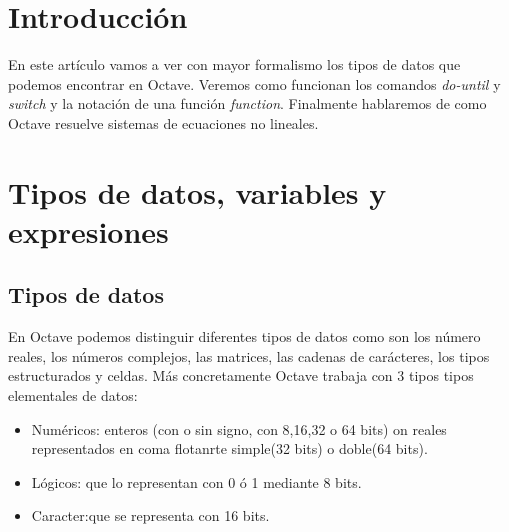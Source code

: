 \section*{Introducción}

En este artículo vamos a ver con mayor formalismo los tipos de datos
que podemos encontrar en Octave. Veremos como funcionan los comandos
\textit{do-until} y \textit{switch} y la notación de una función
\textit{function}. Finalmente hablaremos de como Octave resuelve
sistemas de ecuaciones no lineales.

\section{Tipos de datos, variables y expresiones}
 
\subsection{Tipos de datos}

En Octave podemos distinguir diferentes tipos de datos como son los
número reales, los números complejos, las matrices, las cadenas de
carácteres, los tipos estructurados y celdas. Más concretamente Octave
trabaja con 3 tipos tipos elementales de datos:
\begin{itemize}
\item Numéricos: enteros (con o sin signo, con 8,16,32 o 64 bits) on
  reales representados en coma flotanrte simple(32 bits) o doble(64
  bits).
\item Lógicos: que lo representan con 0 ó 1 mediante 8 bits.
\item Caracter:que se representa con 16 bits.
\end {itemize}

